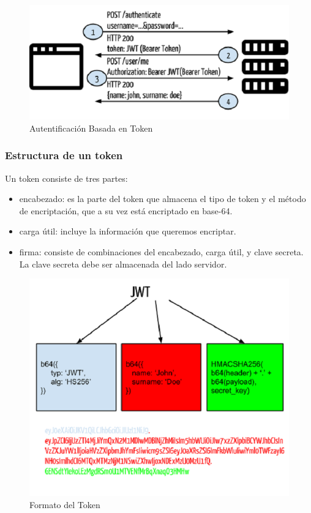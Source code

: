 \begin{figure}[H]
	\centering\includegraphics[scale=0.7]{imagenes/token.png}
	\caption{Autentificación Basada en Token}
	\label{token}
\end{figure}

\newpage

\subsubsection{Estructura de un token}

Un token consiste de tres partes:
\begin{itemize}
	\item encabezado: es la parte del token que almacena el tipo de token y el método de encriptación, que a su vez está encriptado en base-64.
	\item carga útil: incluye la información que queremos encriptar.
	\item firma: consiste de combinaciones del encabezado, carga útil, y clave secreta. La clave secreta debe ser almacenada del lado servidor.
\end{itemize}

\begin{figure}[H]
	\centering\includegraphics[scale=0.5]{imagenes/jwt.png}
	\caption{Formato del Token}
	\label{formatoToken}
\end{figure}

